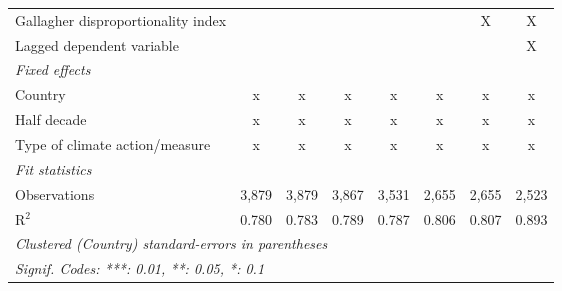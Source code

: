 \begin{tabular}{lccccccc}
   Gallagher disproportionality index                                  &         &         &             &              &                & X              & X\\  
   Lagged dependent variable                                           &         &         &             &              &                &                & X\\  
   \emph{Fixed effects}\\
   Country                                                             & x       & x       & x           & x            & x              & x              & x\\  
   Half decade                                                         & x       & x       & x           & x            & x              & x              & x\\  
   Type of climate action/measure                                      & x       & x       & x           & x            & x              & x              & x\\  
   \midrule \emph{Fit statistics}\\
   Observations                                                        & 3,879   & 3,879   & 3,867       & 3,531        & 2,655          & 2,655          & 2,523\\  
   R$^2$                                                               & 0.780   & 0.783   & 0.789       & 0.787        & 0.806          & 0.807          & 0.893\\  
   \midrule
   \multicolumn{8}{l}{\emph{Clustered (Country) standard-errors in parentheses}}\\
   \multicolumn{8}{l}{\emph{Signif. Codes: ***: 0.01, **: 0.05, *: 0.1}}\\
\end{tabular}
\par\endgroup


